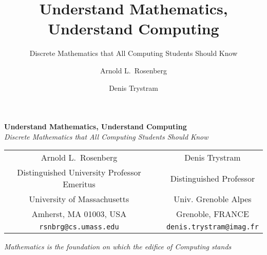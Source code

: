 \documentclass[envcountchap]{svmono}
\begin{document}


\author{Arnold L.~Rosenberg \and Denis Trystram}
\title{Understand Mathematics, Understand Computing}
\subtitle{Discrete Mathematics that All Computing Students Should Know}

\maketitle

\begin{center}
{\Large\bf Understand Mathematics, Understand Computing} \\
{\large\it Discrete Mathematics that All Computing Students Should Know}
\end{center}


\begin{center}
\begin{tabular}{ccc}
{\large Arnold L.~Rosenberg} & & {\large Denis Trystram} \\
Distinguished University Professor Emeritus
  & & Distinguished Professor \\
University of Massachusetts  & & Univ. Grenoble Alpes \\
Amherst, MA 01003, USA       & & Grenoble, FRANCE \\
{\small\tt rsnbrg@cs.umass.edu} & & {\small\tt denis.trystram@imag.fr}
\end{tabular}
\end{center}

\vspace*{.25in}

{\it Mathematics is the foundation on which the edifice of Computing
  stands}

\begin{figure}[h]
\centerline{}
\end{figure}





\frontmatter

%

%

\tableofcontents

\end{document}
